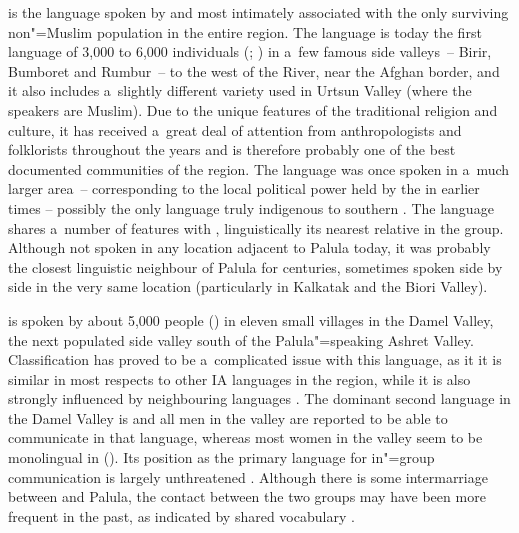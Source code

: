 \textbf{\iliKalasha [kls]} is the language spoken by and most intimately associated with the only surviving non"=Muslim population in the entire region. The language is today the first language of 3,000 to 6,000 individuals (\citealt[xi]{trailcooper1999}; \citealt[8]{heegardpetersen2006}) in a~few famous side valleys~-- Birir, Bumboret and Rumbur~-- to the west of the \iliKunar River, near the Afghan border, and it also includes a~slightly different variety used in Urtsun Valley (where the speakers are Muslim). Due to the unique features of the traditional \iliKalasha religion and culture, it has received a~great deal of attention from anthropologists and folklorists throughout the years and is therefore probably one of the best documented communities of the region. The \iliKalasha language was once spoken in a~much larger area~-- corresponding to the local political power held by the \iliKalasha in earlier times \citep[33]{siiger1956} -- possibly the only language truly indigenous to southern \iliChitral \citep{strand2001}. The language shares a~number of features with \iliKhowar, linguistically its nearest relative in the \iliChitral group. Although not spoken in any location adjacent to Palula today, it was probably the closest linguistic neighbour of Palula for centuries, sometimes spoken side by side in the very same location (particularly in Kalkatak and the Biori Valley).


\textbf{\iliDameli [dml]} is spoken by about 5,000 people (\citealt[118]{decker1992a}) in eleven small villages in the Damel Valley, the next populated side valley south of the Palula"=speaking Ashret Valley. Classification has proved to be a~complicated issue with this language, as it it is similar in most respects to other IA languages in the region, while it is also strongly influenced by neighbouring \iliNuristani languages \citep[254]{strand2001}. The dominant second language in the Damel Valley is \iliPashto and all men in the valley are reported to be able to communicate in that language, whereas most women in the valley seem to be monolingual in \iliDameli (\citealt{decker1992a}). Its position as the primary language for in"=group communication is largely unthreatened \citep[7]{perder2013}. Although there is some intermarriage between \iliDameli and Palula, the contact between the two groups may have been more frequent in the past, as indicated by shared vocabulary \citep[59--60]{morgenstierne1932}.


